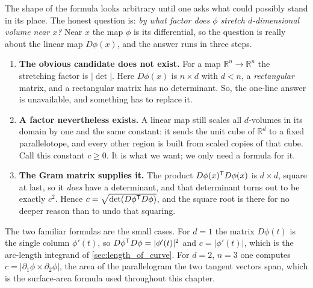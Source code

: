 \begin{remark}
\label{rem:why_gram_determinant}
The shape of the formula looks arbitrary until one asks what could possibly stand in its place.
The honest question is: \emph{by what factor does $\phi$ stretch $d$-dimensional volume near
$x$?} Near $x$ the map $\phi$ is its differential, so the question is really about the linear
map $D\phi(x)$, and the answer runs in three steps.
\begin{enumerate}[label=\textbf{(\alph*)}]
  \item \textbf{The obvious candidate does not exist.} For a map $\mathbb{R}^n \to \mathbb{R}^n$
    the stretching factor is $\lvert\det\rvert$. Here $D\phi(x)$ is $n \times d$ with $d < n$, a
    \emph{rectangular} matrix, and a rectangular matrix has no determinant. So, the one-line
    answer is unavailable, and something has to replace it.
  \item \textbf{A factor nevertheless exists.} A linear map still scales all $d$-volumes in its
    domain by one and the same constant: it sends the unit cube of $\mathbb{R}^d$ to a fixed
    parallelotope, and every other region is built from scaled copies of that cube. Call this
    constant $c \geq 0$. It is what we want; we only need a formula for it.
  \item \textbf{The Gram matrix supplies it.} The product $D\phi(x)^{\mathsf{T}} D\phi(x)$ is
    $d \times d$, square at last, so it \emph{does} have a determinant, and that
    determinant turns out to be exactly $c^2$. Hence $c = \sqrt{\det(D\phi^{\mathsf{T}} D\phi)}$, and
    the square root is there for no deeper reason than to undo that squaring.
\end{enumerate}
The two familiar formulas are the small cases. For $d=1$ the matrix $D\phi(t)$ is the single
column $\phi'(t)$, so $D\phi^{\mathsf{T}} D\phi = \lvert\phi'(t)\rvert^2$ and $c = \lvert\phi'(t)\rvert$,
which is the arc-length integrand of \cref{sec:length_of_curve}. For $d=2$, $n=3$ one computes
$c = \lvert\partial_1\phi \times \partial_2\phi\rvert$, the area of the parallelogram the two
tangent vectors span, which is the surface-area formula used throughout this chapter.
\end{remark}

